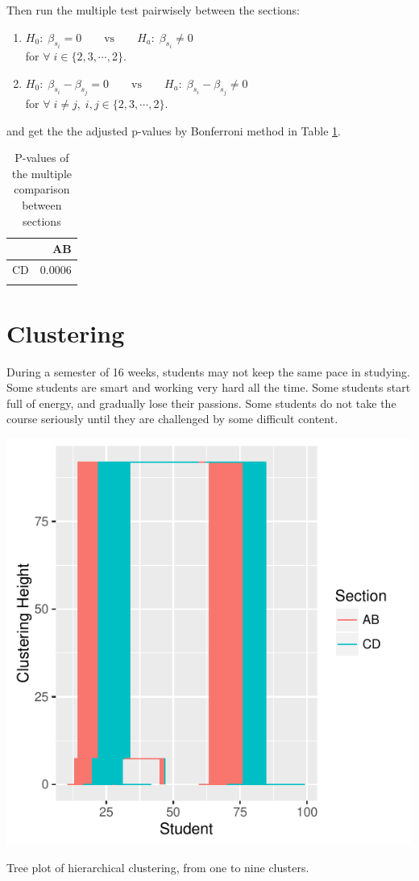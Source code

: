 \documentclass[12pt,nohyper]{tufte-handout}\usepackage[]{graphicx}\usepackage[]{color}
\begin{document}
Then run the multiple test pairwisely between the sections:
\begin{enumerate}
\item $H_{0}:\;\beta_{s_{i}}=0\qquad\textrm{vs}\qquad H_{a}:\;\beta_{s_{i}}\neq0$\\
for $\forall\; i\in\{2,3,\cdots,$2$\}$.
\item $H_{0}:\;\beta_{s_{i}}-\beta_{s_{j}}=0\qquad\textrm{vs}\qquad H_{a}:\;\beta_{s_{i}}-\beta_{s_{j}}\neq0$\\
for $\forall\; i\neq j,\; i,j\in\{2,3,\cdots,$2$\}$.
\end{enumerate}
and get the the adjusted p-values by Bonferroni method in Table \ref{tab:pvalues_sec}.

\begin{longtable}{rr}
  \hline
 & AB \\ 
  \hline
CD & 0.0006 \\ 
   \hline
\hline
\caption{P-values of the multiple comparison between sections} 
\label{tab:pvalues_sec}
\end{longtable}



\clearpage
\newpage{}
\section{Clustering}

During a semester of 16 weeks, students may not keep the same pace 
in studying. Some students are smart and working very hard all the 
time. Some students start full of energy, and gradually lose 
their passions. Some students do not take the course seriously 
until they are challenged by some difficult content.

\begin{marginfigure}
\includegraphics[width=0.98\linewidth]{Stat101_allSections_hclust}
\caption{\label{mar:hclust}Tree plot of hierarchical clustering, 
from one to nine clusters.}
\end{marginfigure}
\end{document}

